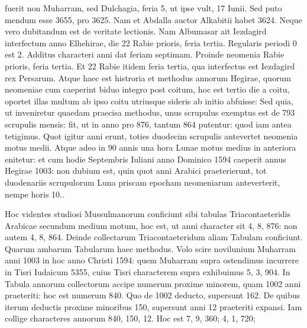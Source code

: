 fuerit non Muharram, sed Dulchagia, feria 5, ut ipse vult, 17 Iunii.
Sed puto mendum esse 3655, pro 3625.
Nam et Abdalla auctor Alkabitii
habet 3624.
Neque vero dubitandum est de veritate lectionis.
Nam Albumasar ait Iezdagird interfectum anno  Elhehirae,
die 22 Rabie prioris, feria tertia.
Regularis periodi 0 est 2.
Additus
characteri anni  dat feriam septimam.
Proinde neomenia Rabie
prioris, feria tertia.
Et 22 Rabie itidem feria tertia, qua interfectus
est Iezdagird rex Persarum.
Atque haec est histroria et methodus
annorum Hegirae, quorum neomeniae cum caeperint biduo integro
post coitum, hoc est tertio die a coitu, oportet illas multum ab ipso
coitu utriusque sideris ab initio abfuisse:
Sed quia, ut inveniretur quaedam
praecisa methodus, unus scrupulus exemptus est de 793 scrupulis mensis:
fit, ut in anno pro 876, tantum 864 putentur: quod iam
antea tetigimus.
%
Quot igitur anni
erunt, toties duodecim scrupulis
antevertet neomenia motus
medii.
Atque adeo in 90 annis
una hora Lunae motus medius
in anteriora enitetur: et cum
hodie  Septembris Iuliani
anno Dominico 1594 caeperit
annus Hegirae 1003: non dubium
est, quin quot anni Arabici
praeterierunt, tot duodenariis
scrupulorum Luna priscam
epocham neomeniarum anteverterit,
nempe horis 10..
\begin{table}[tbp]
  
\end{table}
%
Hoc
videntes studiosi Mussulmanorum
conficiunt sibi tabulas
Triacontaeteridis Arabicae secundum
medium motum, hoc
est, ut anni character sit 4,
8, 876: non autem 4, 8, 864.
Deinde collectarum Triacontaeteridum
aliam Tabulam
conficiunt.
Quarum ambarum
Tabularum haec methodus.
Volo
scire novilunium Muharram
anni 1003 in hoc anno Christi
1594: quem Muharram supra
ostendimus incurrere in Tisri
Iudaicum 5355, cuius Tisri
characterem supra exhibuimus
5, 3, 904.
In Tabula annorum
collectorum accipe numerum proxime minorem, quam 1002 anni
praeteriti: hoc est numerum 840.
Quo de 1002 deducto, supersunt
162.
De quibus iterum deductis proxime minoribus 150, supersunt
anni 12 praeteriti expansi.
Iam collige characteres annorum
840, 150, 12.
Hoc est %
 7, 9, 360; %
 4, 1, 720; %
